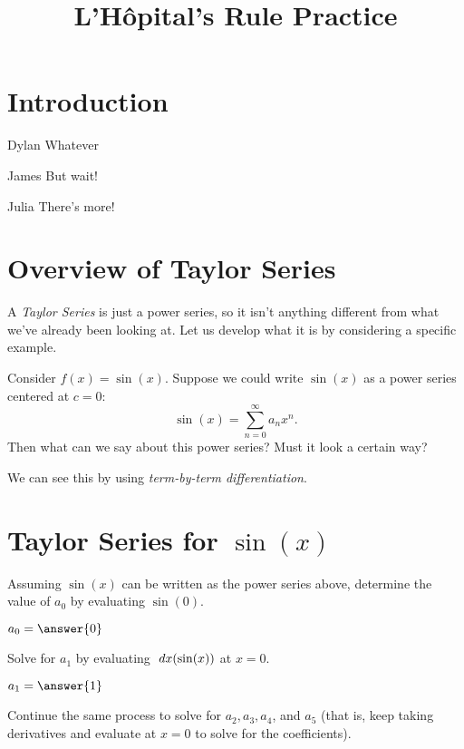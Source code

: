 \documentclass{ximera}
\title{L'H\^{o}pital's Rule Practice}
\begin{document}
\maketitle

\section*{Introduction}

\begin{dialogue}
\item[Dylan] Whatever
\item[James] But wait!
\item[Julia] There's more!
\end{dialogue}


\section{Overview of Taylor Series}

A \emph{Taylor Series} is just a power series, so it isn't anything different from what we've already been looking at. Let us develop what it is by considering a specific example.

Consider $f(x) = \sin(x)$. Suppose we could write $\sin(x)$ as a power series centered at $c=0$:
\[
    \sin(x) = \sum_{n=0}^{\infty} a_n x^n.
\]
Then what can we say about this power series? Must it look a certain way? 
\begin{multipleChoice}
\begin{feedback}[correct]
We can see this by using \emph{term-by-term differentiation}.
\end{feedback}
\end{multipleChoice}

\section{Taylor Series for $\sin(x)$}

Assuming $\sin(x)$ can be written as the power series above, determine the value of $a_0$ by evaluating $\sin(0)$.

$a_0 = \answer{0}$

Solve for $a_1$ by evaluating $\; dx(\sin(x))$ at $x=0$.

$a_1 = \answer{1}$

Continue the same process to solve for $a_2, a_3, a_4$, and $a_5$ (that is, keep taking derivatives and evaluate at $x=0$ to solve for the coefficients).
\end{document}
